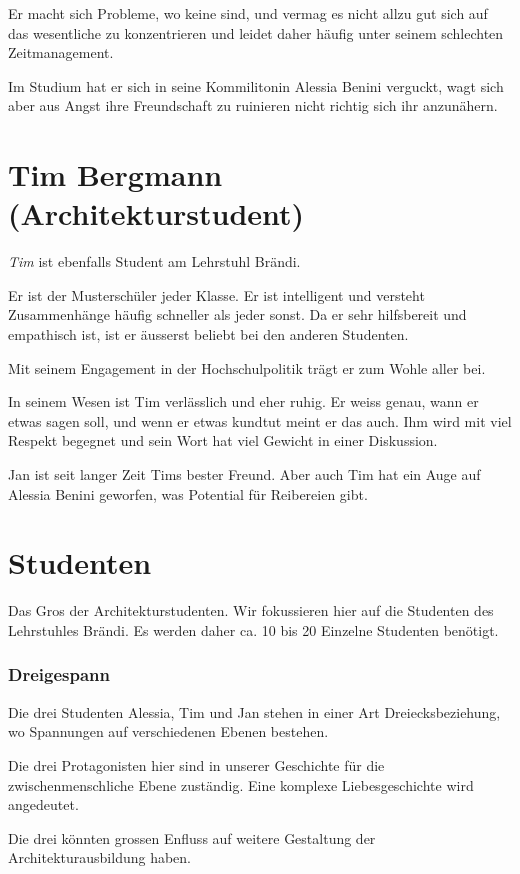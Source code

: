 \documentclass[11pt,a4paper,ngerman]{scrreprt}
\begin{document}
Er macht sich Probleme, wo keine sind, und vermag es nicht allzu gut sich auf
das wesentliche zu konzentrieren und leidet daher häufig unter seinem schlechten
Zeitmanagement.

Im Studium hat er sich in seine Kommilitonin Alessia Benini verguckt, wagt sich
aber aus Angst ihre Freundschaft zu ruinieren nicht richtig sich ihr anzunähern.


\section*{Tim Bergmann (Architekturstudent)}

\emph{Tim} ist ebenfalls Student am Lehrstuhl Brändi.

Er ist der Musterschüler jeder Klasse. Er ist intelligent und versteht
Zusammenhänge häufig schneller als jeder sonst. Da er sehr hilfsbereit und
empathisch ist, ist er äusserst beliebt bei den anderen Studenten.

Mit seinem Engagement in der Hochschulpolitik trägt er zum Wohle aller bei.

In seinem Wesen ist Tim verlässlich und eher ruhig. Er weiss genau, wann er
etwas sagen soll, und wenn er etwas kundtut meint er das auch. Ihm wird mit viel
Respekt begegnet und sein Wort hat viel Gewicht in einer Diskussion.

Jan ist seit langer Zeit Tims bester Freund. Aber auch Tim hat ein Auge auf
Alessia Benini geworfen, was Potential für Reibereien gibt.

\section*{Studenten}

Das Gros der Architekturstudenten. Wir fokussieren hier auf die Studenten des
Lehrstuhles Brändi. Es werden daher ca. 10 bis 20 Einzelne Studenten benötigt.

\subsubsection*{Dreigespann}

Die drei Studenten Alessia, Tim und Jan stehen in einer Art Dreiecksbeziehung,
wo Spannungen auf verschiedenen Ebenen bestehen.

Die drei Protagonisten hier sind in unserer Geschichte für die
zwischenmenschliche Ebene zuständig. Eine komplexe Liebesgeschichte wird
angedeutet.

Die drei könnten grossen Enfluss auf weitere Gestaltung der
Architekturausbildung haben.
\end{document}
